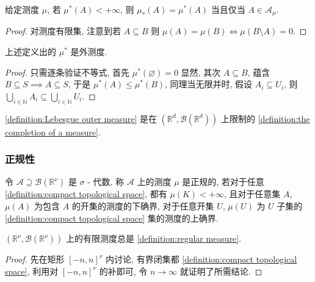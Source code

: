 \begin{lemma}
    给定测度 \(\mu\), 若 \(\mu^\ast (A) < + \infty\), 则 \(\mu_\ast (A) = \mu^\ast (A)\) 当且仅当 \(A \in \mathcal{A}_{\mu}\).

    \begin{proof}
        对测度有限集, 注意到若 \(A \subseteq B\) 则 \(\mu(A) = \mu (B) \iff \mu(B \setminus A) = 0\).
    \end{proof}
\end{lemma}

\begin{lemma}
    上述定义出的 \(\mu^\ast\) 是外测度.

    \begin{proof}
        只需逐条验证不等式, 首先 \(\mu^\ast (\varnothing) = 0\) 显然, 其次 \(A \subseteq B\), 蕴含 \(B \subseteq S \implies A \subseteq S\), 
        于是 \(\mu^\ast (A) \leq \mu^\ast (B)\), 同理当无限并时, 假设 \(A_i \subseteq U_i\), 则 \(\bigcup_{i \in \mathbb{N}} A_i \subseteq \bigcup_{i \in \mathbb{N}} U_i\).
    \end{proof}
\end{lemma}

\begin{corollary}
    \ref{definition:Lebesgue outer measure} 是在 \((\mathbb{R}^d,\mathcal{B} (\mathbb{R}^d))\) 上限制的 \ref{definition:the completion of a measure}.
\end{corollary}

\subsubsection{正规性}

\begin{definition}[正规]
    \label {definition:regular measure}
    令 \(\mathcal{A} \supseteq \mathcal{B} (\mathbb{R}^\nu)\) 是 \(\sigma\) - 代数,
    称 \(\mathcal{A}\) 上的测度 \(\mu\) 是正规的, 若对于任意 \ref{definition:compact topological space},
    都有 \(\mu(K) < +\infty\), 且对于任意集 \(A\), \(\mu(A)\) 为包含 \(A\) 的开集的测度的下确界, 对于任意开集 \(U\), \(\mu(U)\) 为 \(U\) 子集的 \ref{definition:compact topological space} 集的测度的上确界.
\end{definition}

\begin{lemma}
    \((\mathbb{R}^\nu,\mathcal{B} (\mathbb{R}^\nu))\) 上的有限测度总是 \ref{definition:regular measure}.

    \begin{proof}
        先在矩形 \({[-n,n]}^\nu\) 内讨论, 有界闭集都 \ref{definition:compact topological space}, 利用对 \({[-n,n]}^\nu\) 的补即可, 令 \(n \to \infty\) 就证明了所需结论.
    \end{proof}
\end{lemma}

